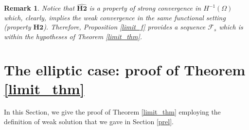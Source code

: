 \documentclass[reqno,twoside]{amsart}
\newtheorem{remark}[theorem]{Remark}
\numberwithin{equation}{section}
\begin{document}
\begin{remark}
	Notice that $\widehat{\textbf{H2}}$ is a property of strong convergence in $H^{-1}(\Omega)$ which, clearly, implies the weak convergence in the same functional setting (property $\textbf{H2}$). Therefore, Proposition \ref{limit_f} provides a sequence $\mathcal{F}_s$ which is within the hypotheses of Theorem \ref{limit_thm}.
\end{remark}

\section{The elliptic case: proof of Theorem \ref{limit_thm}}\label{weak_sec}
In this Section, we give the proof of Theorem \ref{limit_thm} employing the definition of weak solution that we gave in Section \ref{prel}. 
\end{document}

